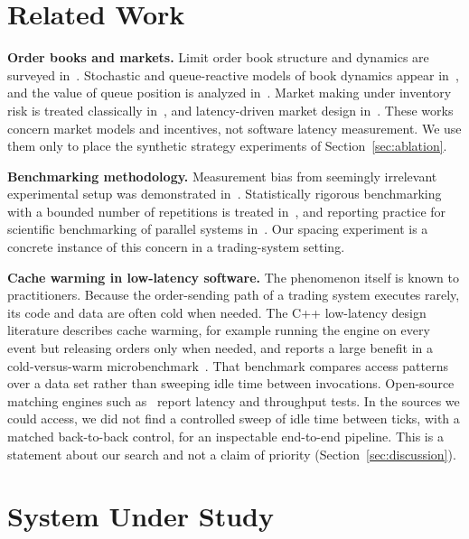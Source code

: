 \documentclass{ieeeaccess}
\begin{document}
\section{Related Work}
\label{sec:related}
\textbf{Order books and markets.} Limit order book structure and dynamics are surveyed in~\cite{gould2013}. Stochastic and queue-reactive models of book dynamics appear in~\cite{cont2010,huang2015}, and the value of queue position is analyzed in~\cite{moallemi2017}. Market making under inventory risk is treated classically in~\cite{avellaneda2008}, and latency-driven market design in~\cite{budish2015}. These works concern market models and incentives, not software latency measurement. We use them only to place the synthetic strategy experiments of Section~\ref{sec:ablation}.

\textbf{Benchmarking methodology.} Measurement bias from seemingly irrelevant experimental setup was demonstrated in~\cite{mytkowicz2009}. Statistically rigorous benchmarking with a bounded number of repetitions is treated in~\cite{kalibera2013}, and reporting practice for scientific benchmarking of parallel systems in~\cite{hoefler2015}. Our spacing experiment is a concrete instance of this concern in a trading-system setting.

\textbf{Cache warming in low-latency software.} The phenomenon itself is known to practitioners. Because the order-sending path of a trading system executes rarely, its code and data are often cold when needed. The C++ low-latency design literature describes cache warming, for example running the engine on every event but releasing orders only when needed, and reports a large benefit in a cold-versus-warm microbenchmark~\cite{bilokon2023}. That benchmark compares access patterns over a data set rather than sweeping idle time between invocations. Open-source matching engines such as~\cite{jericevich2021} report latency and throughput tests. In the sources we could access, we did not find a controlled sweep of idle time between ticks, with a matched back-to-back control, for an inspectable end-to-end pipeline. This is a statement about our search and not a claim of priority (Section~\ref{sec:discussion}).

\section{System Under Study}
\label{sec:system}
\end{document}
